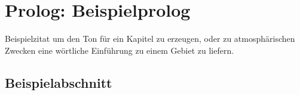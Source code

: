 
\chapter{Prolog: Beispielprolog}
\label{adventure}

\begin{advquote}
\large Beispielzitat um den Ton für ein Kapitel zu erzeugen, oder zu atmosphärischen
Zwecken eine wörtliche Einführung zu einem Gebiet zu liefern.
\end{advquote}

\section*{Beispielabschnitt}
\label{sec:beispiel}
